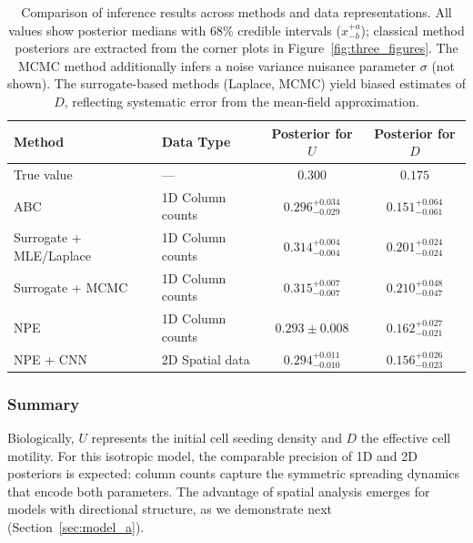 \documentclass{article}
\providecommand{\DIFaddtex}[1]{{\protect\color{blue} \sf #1}} %
\providecommand{\DIFaddFL}[1]{\DIFadd{#1}} %
\providecommand{\DIFadd}[1]{\texorpdfstring{\DIFaddtex{#1}}{#1}} %
\begin{document}
\begin{table}[htbp]
	\centering
	\begin{tabular}{llcc}
		\toprule
		\DIFaddFL{\textbf{Method} }& \DIFaddFL{\textbf{Data Type} }& \DIFaddFL{\textbf{Posterior for $U$} }&  \DIFaddFL{\textbf{Posterior for $D$}  }\\
		\midrule
		\DIFaddFL{True value }& \DIFaddFL{--- }& \DIFaddFL{$0.300$ }& \DIFaddFL{$0.175$ }\\
		\midrule
		\DIFaddFL{ABC }& \DIFaddFL{1D Column counts }& \DIFaddFL{$0.296^{+0.034}_{-0.029}$ }& \DIFaddFL{$0.151^{+0.064}_{-0.061}$ }\\
		\DIFaddFL{Surrogate + MLE/Laplace }& \DIFaddFL{1D Column counts }& \DIFaddFL{$0.314^{+0.004}_{-0.004}$ }& \DIFaddFL{$0.201^{+0.024}_{-0.024}$ }\\
		\DIFaddFL{Surrogate + MCMC }& \DIFaddFL{1D Column counts }& \DIFaddFL{$0.315^{+0.007}_{-0.007}$ }& \DIFaddFL{$0.210^{+0.048}_{-0.047}$ }\\
		\midrule
		\DIFaddFL{NPE }& \DIFaddFL{1D Column counts }& \DIFaddFL{$0.293 \pm 0.008$ }& \DIFaddFL{$0.162^{+0.027}_{-0.021}$}\\
		\DIFaddFL{NPE + CNN }& \DIFaddFL{2D Spatial data }& \DIFaddFL{$0.294^{+0.011}_{-0.010}$ }& \DIFaddFL{$0.156^{+0.026}_{-0.023}$}\\
		\bottomrule
	\end{tabular}
	\caption{\DIFaddFL{Comparison of inference results across methods and data representations. All values show posterior medians with 68\% credible intervals ($x^{+a}_{-b}$); classical method posteriors are extracted from the corner plots in Figure~\ref{fig:three_figures}. The MCMC method additionally infers a noise variance nuisance parameter $\sigma$ (not shown). The surrogate-based methods (Laplace, MCMC) yield biased estimates of $D$, reflecting systematic error from the mean-field approximation.}}
	\label{tab:data_comparison}
\end{table}

\subsubsection{\DIFadd{Summary}}

\DIFadd{Biologically, $U$ represents the initial cell seeding density and $D$ the effective cell motility. For this isotropic model, the comparable precision of 1D and 2D posteriors is expected: column counts capture the symmetric spreading dynamics that encode both parameters. The advantage of spatial analysis emerges for models with directional structure, as we demonstrate next (Section~\ref{sec:model_a}).
}
\end{document}
